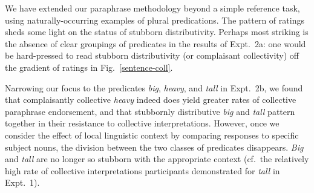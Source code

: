 \documentclass[preprint,12pt,authoryear,titlepage]{elsarticle}
\newcommand{\ndg}[1]{\textcolor{Green}{[ndg: #1]}}
\begin{document}
We have extended our paraphrase methodology beyond a simple reference task, using naturally-occurring examples of plural predications.
The pattern of ratings sheds some light on the status of stubborn distributivity. Perhaps most striking is the absence of clear groupings of predicates in the results of Expt.~2a: one would be hard-pressed to read stubborn distributivity (or complaisant collectivity) off the gradient of ratings in Fig.~\ref{sentence-coll}.




Narrowing our focus to the predicates \emph{big}, \emph{heavy}, and \emph{tall} in Expt.~2b, we found that complaisantly collective \emph{heavy} indeed does yield greater rates of collective paraphrase endorsement, and that stubbornly distributive \emph{big} and \emph{tall} pattern together in their resistance to collective interpretations. However, once we consider the effect of local linguistic context by comparing responses to specific subject nouns, the division between the two classes of predicates disappears. \emph{Big} and \emph{tall} are no longer so stubborn with the appropriate context (cf.~the relatively high rate of collective interpretations participants demonstrated for \emph{tall} in Expt.~1).
\end{document}
